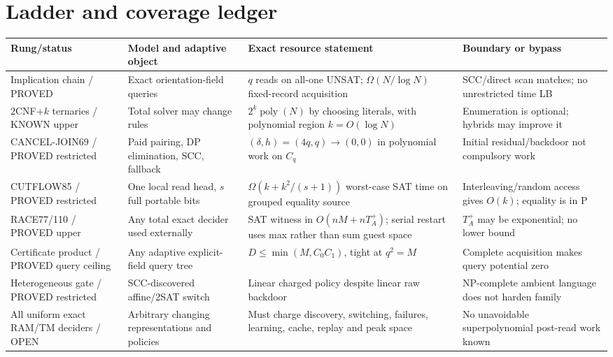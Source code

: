 \documentclass[11pt]{article}
\begin{document}
\section{Ladder and coverage ledger}
\footnotesize\renewcommand{\arraystretch}{1.08}
\begin{longtable}{p{.16\linewidth}p{.19\linewidth}p{.27\linewidth}p{.25\linewidth}}
\toprule
Rung/status & Model and adaptive object & Exact resource statement & Boundary or bypass\\\midrule\endhead
Implication chain / PROVED & Exact orientation-field queries & $q$ reads on all-one UNSAT; $\Omega(N/\log N)$ fixed-record acquisition & SCC/direct scan matches; no unrestricted time LB\\
$2$CNF+$k$ ternaries / KNOWN upper & Total solver may change rules & $2^k\operatorname{poly}(N)$ by choosing literals, with polynomial region $k=O(\log N)$ & Enumeration is optional; hybrids may improve it\\
CANCEL-JOIN69 / PROVED restricted & Paid pairing, DP elimination, SCC, fallback & $(\delta,h)=(4q,q)\to(0,0)$ in polynomial work on $C_q$ & Initial residual/backdoor not compulsory work\\
CUTFLOW85 / PROVED restricted & One local read head, $s$ full portable bits & $\Omega(k+k^2/(s+1))$ worst-case SAT time on grouped equality source & Interleaving/random access gives $O(k)$; equality is in P\\
RACE77/110 / PROVED upper & Any total exact decider used externally & SAT witness in $O(nM+nT_A^+)$; serial restart uses max rather than sum guest space & $T_A^+$ may be exponential; no lower bound\\
Certificate product / PROVED query ceiling & Any adaptive explicit-field query tree & $D\le\min(M,C_0C_1)$, tight at $q^2=M$ & Complete acquisition makes query potential zero\\
Heterogeneous gate / PROVED restricted & SCC-discovered affine/2SAT switch & Linear charged policy despite linear raw backdoor & NP-complete ambient language does not harden family\\
All uniform exact RAM/TM deciders / OPEN & Arbitrary changing representations and policies & Must charge discovery, switching, failures, learning, cache, replay and peak space & No unavoidable superpolynomial post-read work known\\\bottomrule
\end{longtable}\normalsize
\end{document}
